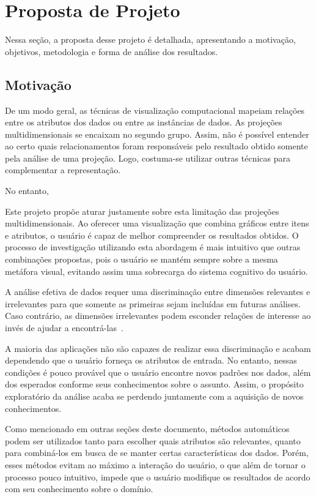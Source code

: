 \section{Proposta de Projeto}

Nessa seção, a proposta desse projeto é detalhada, apresentando a motivação, objetivos, metodologia e forma de análise dos resultados.

\subsection{Motivação}

De um modo geral, as técnicas de visualização computacional mapeiam relações entre os atributos dos dados ou entre as instâncias de dados. As projeções multidimensionais se encaixam no segundo grupo. Assim, não é possível entender ao certo quais relacionamentos foram responsáveis pelo resultado obtido somente pela análise de uma projeção. Logo, costuma-se utilizar outras técnicas para complementar a representação.

No entanto, 

Este projeto propõe aturar justamente sobre esta limitação das projeções multidimensionais. Ao oferecer uma visualização que combina gráficos entre itens e atributos, o usuário é capaz de melhor compreender os resultados obtidos. O processo de investigação utilizando esta abordagem é mais intuitivo que outras combinações propostas, pois o usuário se mantém sempre sobre a mesma metáfora visual, evitando assim uma sobrecarga do sistema cognitivo do usuário.

A análise efetiva de dados requer uma discriminação entre dimensões relevantes e irrelevantes para que somente as primeiras sejam incluídas em futuras análises. Caso contrário, as dimensões irrelevantes podem esconder relações de interesse ao invés de ajudar a encontrá-las~\cite{Guo2003}. 

A maioria das aplicações não são capazes de realizar essa discriminação e acabam dependendo que o usuário forneça os atributos de entrada. No entanto, nessas condições é pouco provável que o usuário encontre novos padrões nos dados, além dos esperados conforme seus conhecimentos sobre o assunto. Assim, o propósito exploratório da análise acaba se perdendo juntamente com a aquisição de novos conhecimentos.    

Como mencionado em outras seções deste documento, métodos automáticos podem ser utilizados tanto para escolher quais atributos são relevantes, quanto para combiná-los em busca de se manter certas características dos dados. Porém, esses métodos evitam ao máximo a interação do usuário, o que além de tornar o processo pouco intuitivo, impede que o usuário modifique os resultados de acordo com seu conhecimento sobre o domínio.

